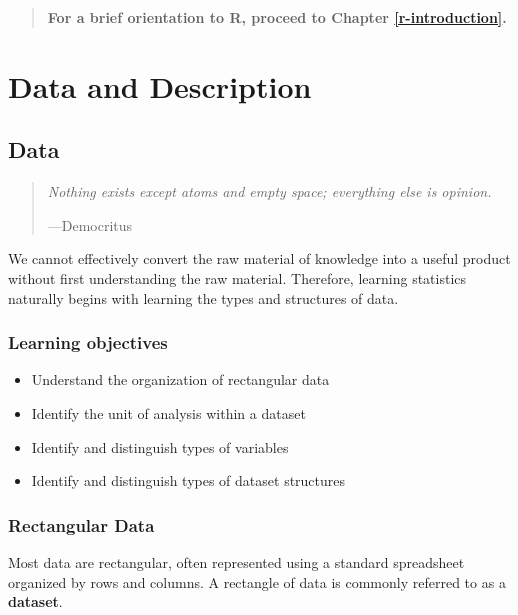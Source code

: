 \documentclass[
]{book}
\providecommand{\tightlist}{%
  \setlength{\itemsep}{0pt}\setlength{\parskip}{0pt}}
\newenvironment{learncheck}%
{%
  \par\vspace{\baselineskip}\noindent 
  \color{Exercise}\begin{itshape}%
  \par\vspace{\baselineskip}\noindent\ignorespaces 
}%
{%
  \end{itshape}\ignorespacesafterend 
}
\begin{document}
\begin{quote}
\textbf{For a brief orientation to R, proceed to Chapter \ref{r-introduction}.}
\end{quote}

\hypertarget{part-data-and-description}{%
\part{Data and Description}\label{part-data-and-description}}

\hypertarget{data}{%
\chapter{Data}\label{data}}

\begin{quote}
\emph{Nothing exists except atoms and empty space; everything else is opinion.}

---Democritus
\end{quote}

We cannot effectively convert the raw material of knowledge into a useful product without first understanding the raw material. Therefore, learning statistics naturally begins with learning the types and structures of data.

\hypertarget{lo2}{%
\section{Learning objectives}\label{lo2}}

\begin{learncheck}
\begin{itemize}
\tightlist
\item
  Understand the organization of rectangular data
\item
  Identify the unit of analysis within a dataset
\item
  Identify and distinguish types of variables
\item
  Identify and distinguish types of dataset structures
\end{itemize}
\end{learncheck}

\hypertarget{rectangular-data}{%
\section{Rectangular Data}\label{rectangular-data}}

Most data are rectangular, often represented using a standard spreadsheet organized by rows and columns. A rectangle of data is commonly referred to as a \textbf{dataset}.
\end{document}
